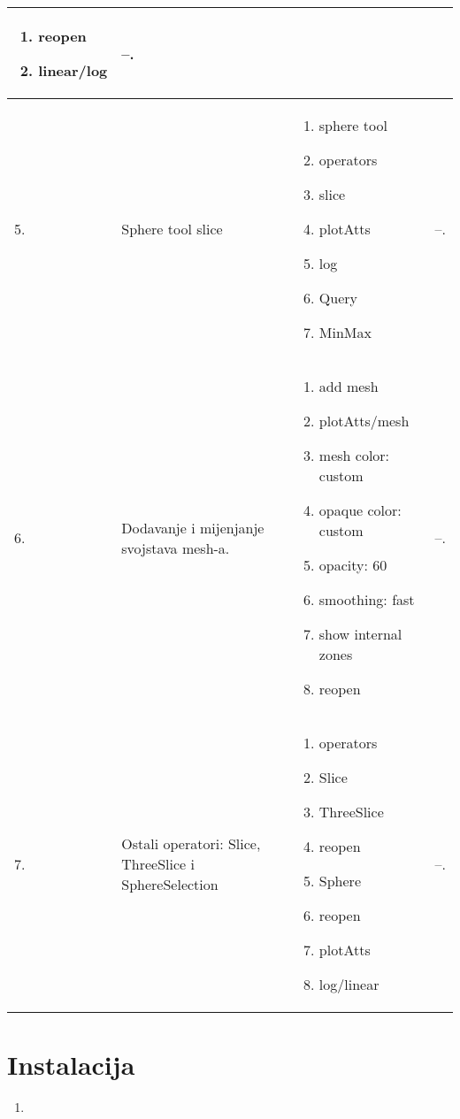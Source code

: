 \documentclass[times, utf8, zavrsni]{fer}
\begin{document}
\begin{longtable}{|l|p{80pt}|p{100pt}|p{120pt}|}
\begin{enumerate}
    \item reopen
    \item linear/log
\end{enumerate}
& --.\\
\hline
5. & Sphere tool slice & \begin{enumerate}
	\item sphere tool    
    \item operators
    \item slice
    \item plotAtts
    \item log
    \item Query
    \item MinMax
\end{enumerate}
& --.\\
\hline
6. & Dodavanje i mijenjanje svojstava mesh-a. & \begin{enumerate}
	\item add mesh
	\item plotAtts/mesh
	\item mesh color: custom
	\item opaque color: custom
	\item opacity: 60%
	\item smoothing: fast
	\item show internal zones
	\item reopen
\end{enumerate}
& --.\\
\hline
7. & Ostali operatori: Slice, ThreeSlice i SphereSelection & \begin{enumerate}
	\item operators
	\item Slice
	\item ThreeSlice
	\item reopen
	\item Sphere
	\item reopen
	\item plotAtts
	\item log/linear
\end{enumerate}
& --.\\
\hline
\end{longtable}
	


\chapter{Instalacija}
\begin{enumerate}
	\item 
\end{enumerate}
\end{document}
